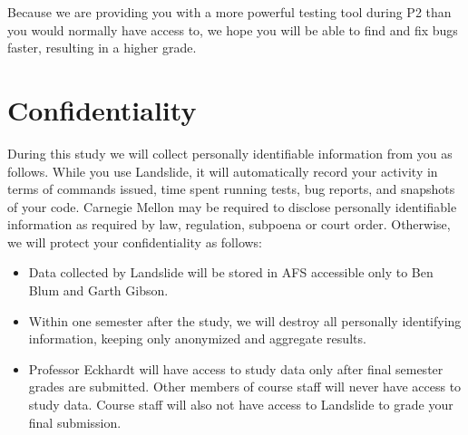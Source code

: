 \documentclass{article}
\begin{document}
Because we are providing you with a more powerful testing tool during P2 than you would normally have access to, we hope you will be able to find and fix bugs faster, resulting in a higher grade.
%

\section{Confidentiality}

During this study we will collect personally identifiable information from you as follows. While you use Landslide, it will automatically record your activity in terms of commands issued, time spent running tests, bug reports, and snapshots of your code.
Carnegie Mellon may be required to disclose personally identifiable information as required by law, regulation, subpoena or court order.
Otherwise, we will protect your confidentiality as follows:

\begin{itemize}
	\item Data collected by Landslide will be stored in AFS accessible only to Ben Blum and Garth Gibson.
	\item Within one semester after the study, we will destroy all personally identifying information, keeping only anonymized and aggregate results.
	\item Professor Eckhardt will have access to study data only after final semester grades are submitted. Other members of course staff will never have access to study data.
		Course staff will also not have access to Landslide to grade your final submission.
\end{itemize}
%
\end{document}
